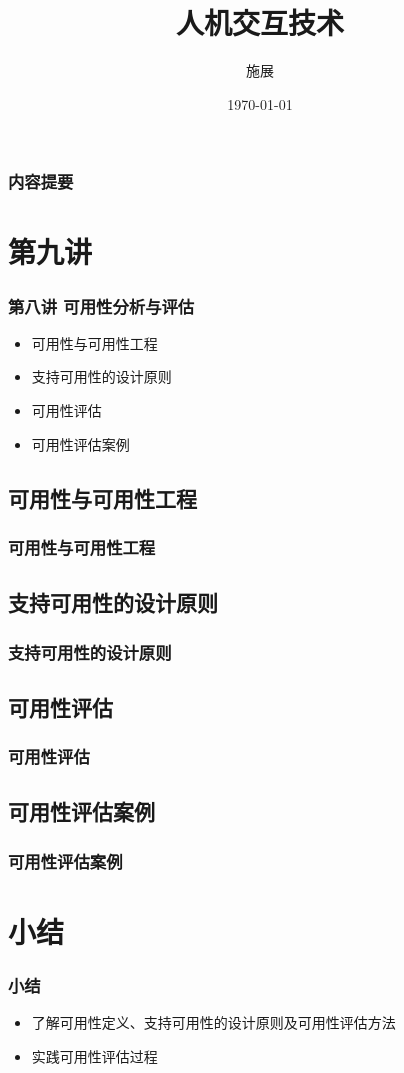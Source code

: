 \documentclass{beamer}
\title{人机交互技术}
\author{施展}
\institute{华中科技大学~武汉光电国家实验室}
\date{\today}
\begin{document}
\begin{frame}
	\frametitle{内容提要}
	\titlepage
\end{frame}

\begin{frame}
	\tableofcontents
\end{frame}

\section{第九讲}
\begin{frame}
	\frametitle{第八讲 可用性分析与评估}
	\begin{itemize}
		\item 可用性与可用性工程
		\item 支持可用性的设计原则
		\item 可用性评估
		\item 可用性评估案例
	\end{itemize}
\end{frame}

\subsection{可用性与可用性工程}
\begin{frame}
	\frametitle{可用性与可用性工程}

\end{frame}

\subsection{支持可用性的设计原则}
\begin{frame}
	\frametitle{支持可用性的设计原则}

\end{frame}

\subsection{可用性评估}
\begin{frame}
	\frametitle{可用性评估}

\end{frame}

\subsection{可用性评估案例}
\begin{frame}
	\frametitle{可用性评估案例}

\end{frame}

\section{小结}
\begin{frame}
	\frametitle{小结}
	\begin{itemize}
		\item 了解可用性定义、支持可用性的设计原则及可用性评估方法
		\item 实践可用性评估过程
	\end{itemize}
\end{frame}
\end{document}
